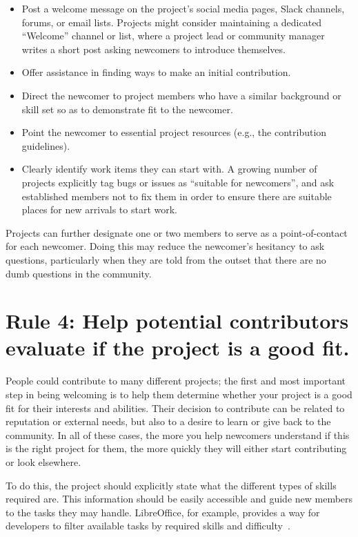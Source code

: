 \documentclass[10pt,letterpaper]{article}
\newcommand{\rulemajor}[1]{\section*{#1}}
\begin{document}
\begin{itemize}

\item
  Post a welcome message on the project's social media pages, Slack channels, forums, or email lists.
  Projects might consider maintaining a dedicated ``Welcome'' channel or list,
  where a project lead or community manager writes a short post asking newcomers to introduce themselves.

\item
  Offer assistance in finding ways to make an initial contribution.

\item
  Direct the newcomer to project members who have a similar background or skill set
  so as to demonstrate fit to the newcomer.

\item
  Point the newcomer to essential project resources (e.g., the contribution guidelines).

\item
  Clearly identify work items they can start with.
  A growing number of projects explicitly tag bugs or issues as ``suitable for newcomers'',
  and ask established members not to fix them
  in order to ensure there are suitable places for new arrivals to start work.
  
\end{itemize}

Projects can further designate one or two members to serve as a point-of-contact for each newcomer.
Doing this may reduce the newcomer's hesitancy to ask questions,
particularly when they are told from the outset that there are no dumb questions in the community.

\rulemajor{Rule 4: Help potential contributors evaluate if the project is a good fit.}

People could contribute to many different projects;
the first and most important step in being welcoming is to help them determine whether
your project is a good fit for their interests and abilities.
Their decision to contribute can be related to reputation or external needs,
but also to a desire to learn or give back to the community.
In all of these cases,
the more you help newcomers understand if this is the right project for them,
the more quickly they will either start contributing or look elsewhere.

To do this,
the project should explicitly state what the different types of skills required are.
This information should be easily accessible and guide new members to the tasks they may handle.
LibreOffice,
for example,
provides a way for developers to filter available tasks by required skills and difficulty~\cite{libreoffice-filtered}.
\end{document}
